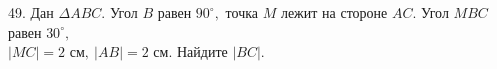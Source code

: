 49. Дан $\Delta ABC.$ Угол $B$ равен $90^\circ,$ точка $M$ лежит на стороне $AC.$ Угол  $MBC$ равен $30^\circ,$\\ $|MC|=2\text{ см},\ |AB|=2\text{ см}.$ Найдите $|BC|.$\\
